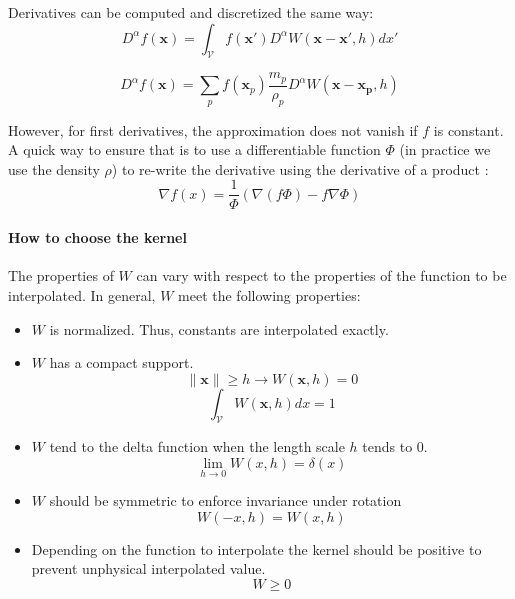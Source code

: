 Derivatives can be computed and discretized the same way:
\begin{equation}
D^{\alpha} f(\mathbf{x}) = \int_{\mathcal{V}} f(\mathbf{x'}) D^{\alpha} W(\mathbf{x}-\mathbf{x'}, h)dx'
\end{equation}

\begin{equation}
D^{\alpha} f(\mathbf{x})= \sum_{p} f(\mathbf{x}_{p})\frac{m_{p}}{\rho_{p}} D^{\alpha} W(\mathbf{x}-\mathbf{x_{p}},h)
\end{equation}

However, for first derivatives, the approximation does not vanish if $f$ is constant. A quick way to ensure that is to use a differentiable function $\Phi$ (in practice we use the density $\rho$) to re-write the derivative using the derivative of a product :
\begin{equation}
\label{eq:hackSPH}
\nabla f(x) = \frac{1}{\Phi}\left(\nabla (f \Phi) - f \nabla \Phi \right)
\end{equation}

\paragraph{How to choose the kernel}
The properties of $W$ can vary with respect to the properties of the function to be interpolated. In general, $W$ meet the following properties:
\begin{itemize}
\item $W$ is normalized. Thus, constants are interpolated exactly.
\item $W$ has a compact support.
\begin{equation}
\parallel \mathbf{x} \parallel \geq h \rightarrow W(\mathbf{x},h) = 0 
\end{equation}
\begin{equation}
\int_{\mathcal{V}} W(\mathbf{x},h) dx = 1
\end{equation}
\item $W$ tend to the delta function when the length scale $h$ tends to $0$.
\begin{equation}
\lim_{h \rightarrow 0} W(x,h) = \delta(x)
\end{equation}
\item $W$ should be symmetric to enforce invariance under rotation
\begin{equation}
W(-x,h) = W(x,h)
\end{equation}
\item Depending on the function to interpolate the kernel should be positive to prevent unphysical interpolated value.
\begin{equation}
W \geq 0
\end{equation}
\end{itemize}

